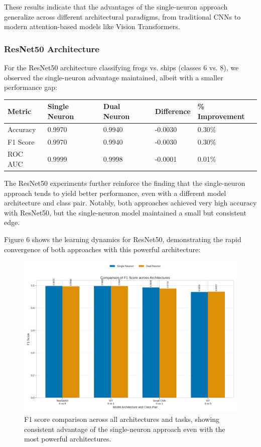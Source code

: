 \documentclass[11pt]{article}
\begin{document}
These results indicate that the advantages of the single-neuron approach generalize across different architectural paradigms, from traditional CNNs to modern attention-based models like Vision Transformers.

\subsubsection{ResNet50 Architecture}
For the ResNet50 architecture classifying frogs vs. ships (classes 6 vs. 8), we observed the single-neuron advantage maintained, albeit with a smaller performance gap:

\begin{tabular}{lllll}
\hline
Metric & Single Neuron & Dual Neuron & Difference & \% Improvement \\
\hline
Accuracy & 0.9970 & 0.9940 & -0.0030 & 0.30\% \\
F1 Score & 0.9970 & 0.9940 & -0.0030 & 0.30\% \\
ROC AUC & 0.9999 & 0.9998 & -0.0001 & 0.01\% \\
\hline
\end{tabular}

The ResNet50 experiments further reinforce the finding that the single-neuron approach tends to yield better performance, even with a different model architecture and class pair. Notably, both approaches achieved very high accuracy with ResNet50, but the single-neuron model maintained a small but consistent edge.

Figure 6 shows the learning dynamics for ResNet50, demonstrating the rapid convergence of both approaches with this powerful architecture:

\begin{figure}[htbp]
\centering
\includegraphics[width=\textwidth]{figures/f1_score_comparison.png}
\caption{F1 score comparison across all architectures and tasks, showing consistent advantage of the single-neuron approach even with the most powerful architectures.}
\end{figure}
\end{document}
